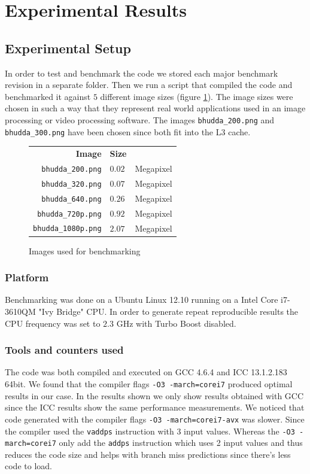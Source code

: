 \section{Experimental Results}\label{sec:exp}
\subsection{Experimental Setup}\label{sec:exp_setup8}
In order to test and benchmark the code we stored each major benchmark revision in a separate folder. Then we run a script that compiled the code and benchmarked it against $5$ different image sizes (figure \ref{tab:images}). The image sizes were chosen in such a way that they represent real world applications used in an image processing or video processing software. The images \texttt{bhudda\_200.png} and \texttt{bhudda\_300.png} have been chosen since both fit into the L3 cache. 
\begin{figure}
\centering
{\small
\begin{tabular}{rll}
\textbf{Image} & \textbf{Size}\\
\texttt{bhudda\_200.png} & $0.02$ & Megapixel\\
\texttt{bhudda\_320.png} & $0.07$ & Megapixel\\
\texttt{bhudda\_640.png} & $0.26$ & Megapixel\\
\texttt{bhudda\_720p.png} & $0.92$ & Megapixel\\
\texttt{bhudda\_1080p.png} & $2.07$ & Megapixel\\
\end{tabular}
}
\caption{Images used for benchmarking}
\label{tab:images}
\end{figure}

\subsubsection{Platform}
Benchmarking was done on a Ubuntu Linux 12.10 running on a Intel Core i7-3610QM "Ivy Bridge" CPU. In order to generate repeat reproducible results the CPU frequency was set to $2.3$ GHz with Turbo Boost disabled.
\subsubsection{Tools and counters used}
The code was both compiled and executed on GCC 4.6.4 and ICC 13.1.2.183 64bit. We found that the compiler flags \lstinline{-O3 -march=corei7} produced optimal results in our case. In the results shown we only show results obtained with GCC since the ICC results show the same performance measurements. We noticed that code generated with the compiler flags \lstinline{-O3 -march=corei7-avx} was slower. Since the compiler used the \lstinline{vaddps} instruction with 3 input values. Whereas the \lstinline{-O3 -march=corei7} only add the \lstinline{addps} instruction which uses 2 input values and thus reduces the code size and helps with branch miss predictions since there's less code to load. 


